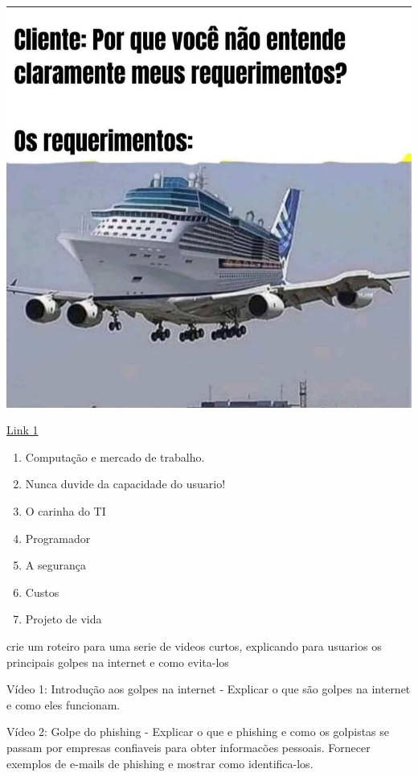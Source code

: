 \begin{center}
	\includegraphics[width=\linewidth]{./IMG/usuario.jpg}
\end{center}


\large
\label{link1}
\href{http://www.link1.com}{Link 1}


\begin{enumerate}
	\item Computação e mercado de trabalho.
	\item Nunca duvide da capacidade do usuario!
	\item O carinha do TI
	\item Programador
	\item A segurança
	\item Custos
	\item Projeto de vida
\end{enumerate}

crie um roteiro para uma serie de videos curtos, explicando para usuarios os principais golpes na internet e como evita-los 

Vídeo 1: Introdução aos golpes na internet - Explicar o que são golpes na internet e como eles funcionam.

Vídeo 2: Golpe do phishing - Explicar o que e phishing e como os golpistas se passam por empresas confiaveis para obter informacões pessoais. Fornecer exemplos de e-mails de phishing e mostrar como identifica-los.

